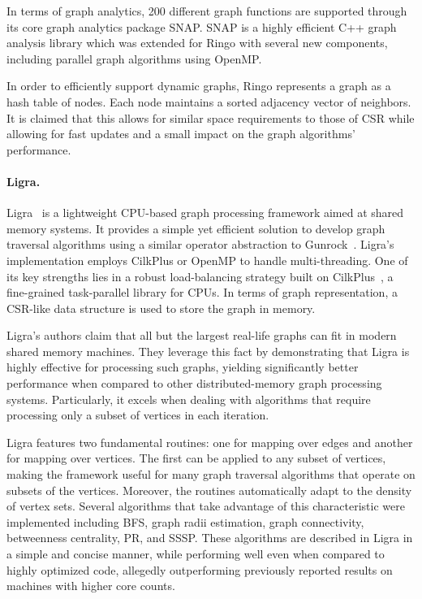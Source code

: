     In terms of graph analytics, 200 different graph functions are supported through its core graph analytics package SNAP. SNAP is a highly efficient C++ graph analysis library which was extended for Ringo with several new components, including parallel graph algorithms using OpenMP.

    In order to efficiently support dynamic graphs, Ringo represents a graph as a hash table of nodes. Each node maintains a sorted adjacency vector of neighbors. It is claimed that this allows for similar space requirements to those of \gls{CSR} while allowing for fast updates and a small impact on the graph algorithms' performance.

    \paragraph{\textbf{Ligra}.}
    Ligra~\cite{paper:ligra} is a lightweight \gls{CPU}-based graph processing framework aimed at shared memory systems. It provides a simple yet efficient solution to develop graph traversal algorithms using a similar operator abstraction to Gunrock~\cite{paper:gunrock}. Ligra's implementation employs CilkPlus or OpenMP to handle multi-threading.  One of its key strengths lies in a robust load-balancing strategy built on CilkPlus~\cite{paper:cilkplus}, a fine-grained task-parallel library for CPUs. In terms of graph representation, a \gls{CSR}-like data structure is used to store the graph in memory.

    Ligra's authors claim that all but the largest real-life graphs can fit in modern shared memory machines. They leverage this fact by demonstrating that Ligra is highly effective for processing such graphs, yielding significantly better performance when compared to other distributed-memory graph processing systems. Particularly, it excels when dealing with algorithms that require processing only a subset of vertices in each iteration.
    
    Ligra features two fundamental routines: one for mapping over edges and another for mapping over vertices. The first can be applied to any subset of vertices, making the framework useful for many graph traversal algorithms that operate on subsets of the vertices. Moreover, the routines automatically adapt to the density of vertex sets. Several algorithms that take advantage of this characteristic were implemented including \gls{BFS}, graph radii estimation, graph connectivity, betweenness centrality, \gls{PR}, and \gls{SSSP}. These algorithms are described in Ligra in a simple and concise manner, while performing well even when compared to highly optimized code, allegedly outperforming previously reported results on machines with higher core counts. 

